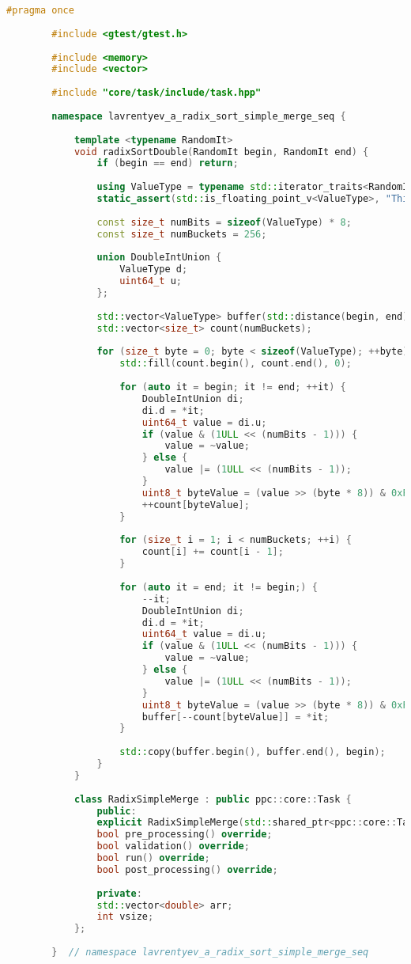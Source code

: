 \documentclass[12pt]{article}
\begin{document}
	\begin{lstlisting}[language=C++]
		#pragma once
		
		#include <gtest/gtest.h>
		
		#include <memory>
		#include <vector>
		
		#include "core/task/include/task.hpp"
		
		namespace lavrentyev_a_radix_sort_simple_merge_seq {
			
			template <typename RandomIt>
			void radixSortDouble(RandomIt begin, RandomIt end) {
				if (begin == end) return;
				
				using ValueType = typename std::iterator_traits<RandomIt>::value_type;
				static_assert(std::is_floating_point_v<ValueType>, "This function is designed for floating-point types.");
				
				const size_t numBits = sizeof(ValueType) * 8;
				const size_t numBuckets = 256;
				
				union DoubleIntUnion {
					ValueType d;
					uint64_t u;
				};
				
				std::vector<ValueType> buffer(std::distance(begin, end));
				std::vector<size_t> count(numBuckets);
				
				for (size_t byte = 0; byte < sizeof(ValueType); ++byte) {
					std::fill(count.begin(), count.end(), 0);
					
					for (auto it = begin; it != end; ++it) {
						DoubleIntUnion di;
						di.d = *it;
						uint64_t value = di.u;
						if (value & (1ULL << (numBits - 1))) {
							value = ~value;
						} else {
							value |= (1ULL << (numBits - 1));
						}
						uint8_t byteValue = (value >> (byte * 8)) & 0xFF;
						++count[byteValue];
					}
					
					for (size_t i = 1; i < numBuckets; ++i) {
						count[i] += count[i - 1];
					}
					
					for (auto it = end; it != begin;) {
						--it;
						DoubleIntUnion di;
						di.d = *it;
						uint64_t value = di.u;
						if (value & (1ULL << (numBits - 1))) {
							value = ~value;
						} else {
							value |= (1ULL << (numBits - 1));
						}
						uint8_t byteValue = (value >> (byte * 8)) & 0xFF;
						buffer[--count[byteValue]] = *it;
					}
					
					std::copy(buffer.begin(), buffer.end(), begin);
				}
			}
			
			class RadixSimpleMerge : public ppc::core::Task {
				public:
				explicit RadixSimpleMerge(std::shared_ptr<ppc::core::TaskData> taskData_) : Task(std::move(taskData_)) {}
				bool pre_processing() override;
				bool validation() override;
				bool run() override;
				bool post_processing() override;
				
				private:
				std::vector<double> arr;
				int vsize;
			};
			
		}  // namespace lavrentyev_a_radix_sort_simple_merge_seq
	\end{lstlisting}
	
\end{document}
